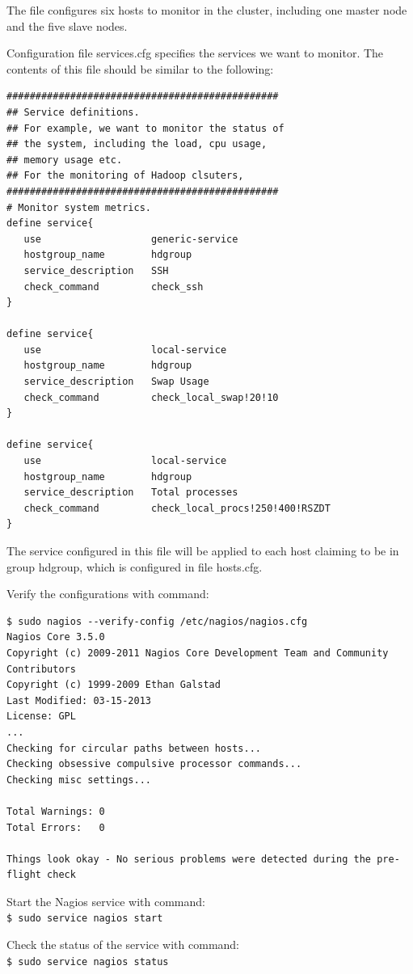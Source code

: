 The file configures six hosts to monitor in the cluster, including one master node and the five slave nodes.

Configuration file services.cfg specifies the services we want to monitor. The contents of this file should be similar to the following: 
\lstset{style=bashstyle}
\begin{lstlisting}
###############################################
## Service definitions.
## For example, we want to monitor the status of
## the system, including the load, cpu usage,
## memory usage etc.
## For the monitoring of Hadoop clsuters,
###############################################
# Monitor system metrics.
define service{
   use                   generic-service
   hostgroup_name        hdgroup
   service_description   SSH
   check_command         check_ssh
}

define service{
   use                   local-service
   hostgroup_name        hdgroup
   service_description   Swap Usage
   check_command         check_local_swap!20!10
}

define service{
   use                   local-service
   hostgroup_name        hdgroup
   service_description   Total processes
   check_command         check_local_procs!250!400!RSZDT
}
\end{lstlisting}

The service configured in this file will be applied to each host claiming to be in group hdgroup, which is configured in file hosts.cfg.


Verify the configurations with command: 
\lstset{style=bashstyle}
\begin{lstlisting}
$ sudo nagios --verify-config /etc/nagios/nagios.cfg
Nagios Core 3.5.0
Copyright (c) 2009-2011 Nagios Core Development Team and Community Contributors
Copyright (c) 1999-2009 Ethan Galstad
Last Modified: 03-15-2013
License: GPL
...
Checking for circular paths between hosts...
Checking obsessive compulsive processor commands...
Checking misc settings...

Total Warnings: 0
Total Errors:   0

Things look okay - No serious problems were detected during the pre-flight check
\end{lstlisting}

Start the Nagios service with command: \\
\verb|$ sudo service nagios start|

Check the status of the service with command: \\
\verb|$ sudo service nagios status|


